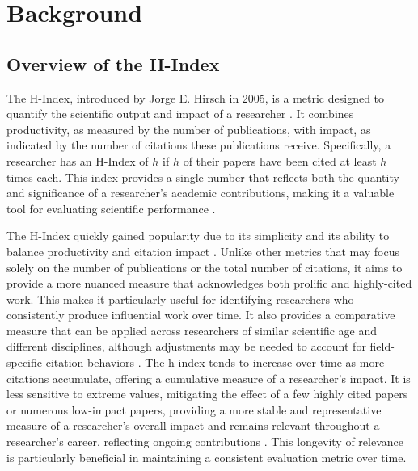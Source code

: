 \chapter{Background}
\label{ch:background}

\section{Overview of the H-Index}
The H-Index, introduced by Jorge E. Hirsch in 2005, is a metric designed to
quantify the scientific output and impact of a researcher
\cite{hirsch2005index,hirsch2014meaning,koltun2021h}. It combines productivity,
as measured by the number of publications, with impact, as indicated by the
number of citations these publications receive. Specifically, a researcher has
an H-Index of $h$ if $h$ of their papers have been cited at least $h$ times
each. This index provides a single number that reflects both the quantity and
significance of a researcher’s academic contributions, making it a valuable
tool for evaluating scientific performance
\cite{hirsch2005index,hirsch2014meaning}.

The H-Index quickly gained popularity due to its simplicity and its ability to
balance productivity and citation impact
\cite{hirsch2005index,bornmann2007what,costas2007h,waltman2012inconsistency,hirsch2014meaning,koltun2021h}.
Unlike other metrics that may focus solely on the number of publications or the
total number of citations, it aims to provide a more nuanced measure that
acknowledges both prolific and highly-cited work. This makes it particularly
useful for identifying researchers who consistently produce influential work
over time. It also provides a comparative measure that can be applied across
researchers of similar scientific age and different disciplines, although
adjustments may be needed to account for field-specific citation behaviors
\cite{hirsch2005index,bornmann2007what,costas2007h,egghe2010hirsch}. The
h-index tends to increase over time as more citations accumulate, offering a
cumulative measure of a researcher’s impact. It is less sensitive to extreme
values, mitigating the effect of a few highly cited papers or numerous
low-impact papers, providing a more stable and representative measure of a
researcher's overall impact and remains relevant throughout a researcher's
career, reflecting ongoing contributions
\cite{hirsch2005index,costas2007h,waltman2012inconsistency,egghe2010hirsch}.
This longevity of relevance is particularly beneficial in maintaining a
consistent evaluation metric over time.

